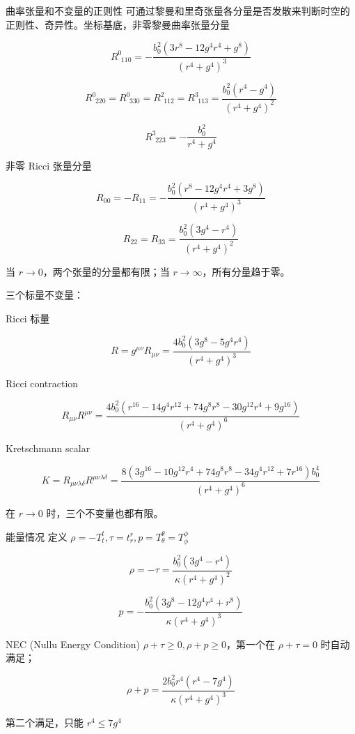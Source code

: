 \documentclass[9pt, dvipsnames]{beamer} %
\begin{document}
\begin{frame}{曲率张量和不变量的正则性}
    可通过黎曼和里奇张量各分量是否发散来判断时空的正则性、奇异性。坐标基底，非零黎曼曲率张量分量

    $$
    R^0_{~~ 110} 
    =-\frac{b_0^2\left(3r^8 - 12 g^4 r^4 + g^8 \right) }{\left(r^4+g^4 \right)^3 } 
    $$
    
    $$
    R^0_{~~220} = R^0_{~~330} = R^2_{~~112} = R^3_{~~113}
    =\frac{b_0^2\left(r^4-g^4 \right) }{\left(r^4+g^4 \right)^2 }
    $$
    
    $$
    R^3_{~~223}
    =-\frac{b_0^2 }{r^4+g^4 } 
    $$
    
    非零 Ricci 张量分量
    
    $$
    R_{00} = -R_{11} = -\frac{b_0^2\left(r^8-12g^4r^4+3g^8 \right) }{\left(r^4+g^4 \right)^3 } 
    $$
    
    $$
    R_{22} = R_{33} = \frac{b_0^2 \left(3g^4-r^4 \right) }{\left(r^4+g^4 \right)^2 }
    $$
    
    当 $r\to 0 $，两个张量的分量都有限；当 $r\to \infty $，所有分量趋于零。
\end{frame}

\begin{frame}
    三个标量不变量：
    
    Ricci 标量
    
    $$
    R = g^{\mu\nu}R_{\mu\nu}
    =\frac{4b_0^2\left(3g^8-5g^4r^4 \right) }{\left(r^4+g^4 \right)^3 }
    $$
    
    Ricci contraction
    
    $$
    R_{\mu\nu} R^{\mu\nu}
    =\frac{4b_0^2 \left(r^{16}-14g^4r^{12}+74g^8r^8-30g^{12}r^4+9g^{16} \right) }{\left(r^4+g^4 \right)^6 }
    $$
    
    Kretschmann scalar
    
    $$
    K
    =R_{\mu\nu\lambda\delta} R^{\mu\nu\lambda\delta}
    =\frac{8\left(3g^{16}-10g^{12}r^4+74 g^8 r^8-34g^4r^{12}+7r^{16} \right)b_0^4 }{\left(r^4+g^4 \right)^6 }
    $$
    
    在 $r\to 0$ 时，三个不变量也都有限。 
\end{frame}

\begin{frame}{能量情况}
    定义 $\rho=-T_t^t,\tau=t_r^r,p=T_\theta^\theta=T_\phi^\phi $

    $$
    \rho=-\tau
    =\frac{b_0^2\left(3g^4-r^4 \right) }{\kappa \left(r^4+g^4 \right)^2 } 
    $$
    
    $$
    p
    =-\frac{b_0^2\left(3g^8-12g^4r^4+r^8 \right) }{\kappa \left(r^4+g^4 \right)^3 }
    $$
    
    NEC (Nullu Energy Condition) $\rho+\tau \geqslant 0,\rho+p\geqslant 0 $，第一个在 $\rho+\tau=0 $ 时自动满足；
    
    $$
    \rho+p
    =\frac{2b_0^2 r^4\left(r^4-7g^4 \right) }{\kappa \left(r^4+g^4 \right)^3 }
    $$
    
    第二个满足，只能 $r^4\leqslant 7g^4 $
\end{frame}
\end{document}

